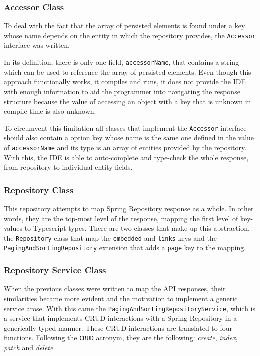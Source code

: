 \subsubsection{Accessor Class}
To deal with the fact that the array of persisted elements is found under a key whose name depends on the entity in which the repository provides, the \texttt{Accessor} interface was written.

In its definition, there is only one field, \texttt{accessorName}, that contains a string which can be used to reference the array of persisted elements. Even though this approach functionally works, it compiles and runs, it does not provide the \gls{IDE} with enough information to aid the programmer into navigating the response structure because the value of accessing an object with a key that is unknown in compile-time is also unknown.

To circumvent this limitation all classes that implement the \texttt{Accessor} interface should also contain a option key whose name is the same one defined in the value of \texttt{accessorName} and its type is an array of entities provided by the repository. With this, the \gls{IDE} is able to auto-complete and type-check the whole response, from repository to individual entity fields.

\subsubsection{Repository Class}
This repository attempts to map Spring Repository response as a whole. In other words, they are the top-most level of the response, mapping the first level of key-values to Typescript types. There are two classes that make up this abstraction, the \texttt{Repository} class that map the \texttt{\textunderscore embedded} and \texttt{\textunderscore links} keys and the \texttt{PagingAndSortingRepository} extension that adds a \texttt{page} key to the mapping.

\subsubsection{Repository Service Class}\label{hateoas:service}
When the previous classes were written to map the \gls{API} responses, their similarities became more evident and the motivation to implement a generic service arose. With this came the \texttt{PagingAndSortingRepositoryService}, which is a service that implements \gls{CRUD} interactions with a Spring Repository in a generically-typed manner. These \gls{CRUD} interactions are translated to four functions. Following the \texttt{CRUD} acronym, they are the following: \textit{create}, \textit{index}, \textit{patch} and \textit{delete}.

